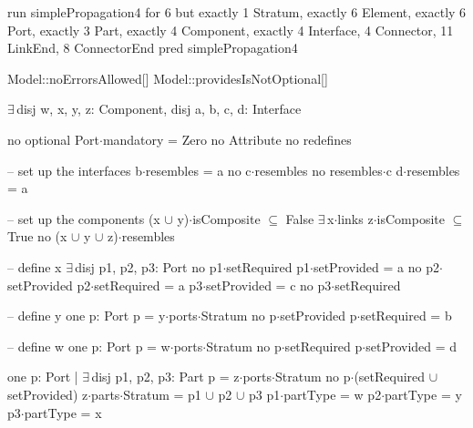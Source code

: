 run simplePropagation4 for 6 but exactly 1 Stratum, exactly 6 Element, exactly 6 Port, exactly 3 Part, exactly 4 Component, exactly 4 Interface, 4 Connector, 11 LinkEnd, 8 ConnectorEnd
pred simplePropagation4
{
  Model::noErrorsAllowed[]
  Model::providesIsNotOptional[]

  $\exists\,$disj w, x, y, z: Component,
       disj a, b, c, d: Interface
  {
    no optional
    Port$\cdot$mandatory = Zero
    no Attribute
    no redefines
  
    -- set up the interfaces
    b$\cdot$resembles = a
    no c$\cdot$resembles
    no resembles$\cdot$c
    d$\cdot$resembles = a
  
    -- set up the components
    (x $\cup$ y)$\cdot$isComposite $\subseteq$ False
    $\exists\,$x$\cdot$links
    z$\cdot$isComposite $\subseteq$ True
    no (x $\cup$ y $\cup$ z)$\cdot$resembles
    
    -- define x
    $\exists\,$disj p1, p2, p3: Port
    {
      no p1$\cdot$setRequired
      p1$\cdot$setProvided = a
      no p2$\cdot$setProvided
      p2$\cdot$setRequired = a
      p3$\cdot$setProvided = c
      no p3$\cdot$setRequired
    }
    
    -- define y
    one p: Port
    {
      p = y$\cdot$ports$\cdot$Stratum
      no p$\cdot$setProvided
      p$\cdot$setRequired = b
    }
    
    -- define w
    one p: Port
    {
      p = w$\cdot$ports$\cdot$Stratum
      no p$\cdot$setRequired
      p$\cdot$setProvided = d
    }
    
    one p: Port | $\exists\,$disj p1, p2, p3: Part
    {
      p = z$\cdot$ports$\cdot$Stratum
      no p$\cdot$(setRequired $\cup$ setProvided)
      z$\cdot$parts$\cdot$Stratum = p1 $\cup$ p2 $\cup$ p3
      p1$\cdot$partType = w
      p2$\cdot$partType = y
      p3$\cdot$partType = x
    }
  }
}


